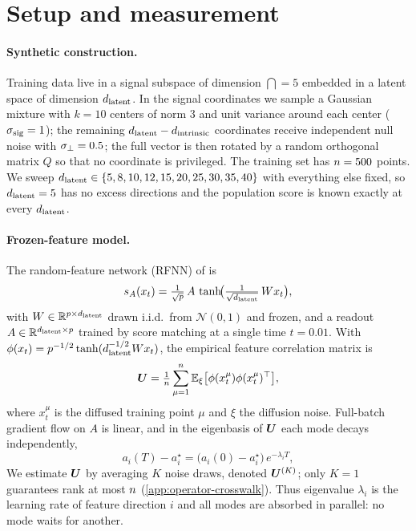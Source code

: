 \section{Setup and measurement}
\label{sec:setup}\label{sec:design}

\paragraph{Synthetic construction.}
Training data live in a signal subspace of dimension $\dint=5$ embedded in a latent space of dimension $d_{\mathrm{latent}}$. In the signal coordinates we sample a Gaussian mixture with $k=10$ centers of norm $3$ and unit variance around each center ($\sigma_{\mathrm{sig}}=1$); the remaining $d_{\mathrm{latent}}-d_{\mathrm{intrinsic}}$ coordinates receive independent null noise with $\sigma_{\perp}=0.5$; the full vector is then rotated by a random orthogonal matrix $Q$ so that no coordinate is privileged. The training set has $n=500$ points. We sweep $d_{\mathrm{latent}}\in\{5,8,10,12,15,20,25,30,35,40\}$ with everything else fixed, so $d_{\mathrm{latent}}=5$ has no excess directions and the population score is known exactly at every $d_{\mathrm{latent}}$.

\paragraph{Frozen-feature model.}
The random-feature network (RFNN) of \citet{bonnaire2025} is
\begin{equation}
  s_A(x_t)=\tfrac{1}{\sqrt{p}}\,A\,\tanh\!\bigl(\tfrac{1}{\sqrt{d_{\mathrm{latent}}}}\,Wx_t\bigr),
  \label{eq:rfnn}
\end{equation}
with $W\in\mathbb{R}^{p\times d_{\mathrm{latent}}}$ drawn i.i.d.\ from $\mathcal N(0,1)$ and frozen, and a readout $A\in\mathbb{R}^{d_{\mathrm{latent}}\times p}$ trained by score matching at a single time $t=0.01$. With $\phi(x_t)=p^{-1/2}\tanh(d_{\mathrm{latent}}^{-1/2}Wx_t)$, the empirical feature correlation matrix is
\begin{equation}
  \bm{U}=\tfrac{1}{n}\sum_{\mu=1}^{n}\mathbb{E}_\xi\bigl[\phi(x_t^\mu)\phi(x_t^\mu)^\top\bigr],
  \label{eq:U}
\end{equation}
where $x_t^\mu$ is the diffused training point $\mu$ and $\xi$ the diffusion noise. Full-batch gradient flow on $A$ is linear, and in the eigenbasis of $\bm{U}$ each mode decays independently,
\begin{equation}
  a_i(T)-a_i^\star=\bigl(a_i(0)-a_i^\star\bigr)\,e^{-\lambda_i T},
  \label{eq:rfnn-gradflow}
\end{equation}
We estimate $\bm{U}$ by averaging $K$ noise draws, denoted $\bm{U}^{(K)}$; only $K=1$ guarantees rank at most $n$ (\cref{app:operator-crosswalk}). Thus eigenvalue $\lambda_i$ is the learning rate of feature direction $i$ and all modes are absorbed in parallel: no mode waits for another.

